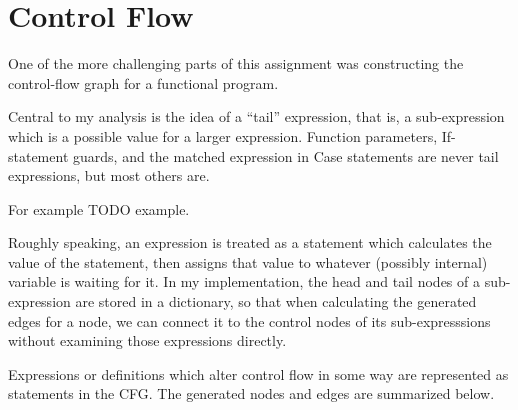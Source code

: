 \documentclass{article}
\begin{document}
\section{Control Flow}

One of the more challenging parts of this assignment was constructing the control-flow graph for a functional program.

Central to my analysis is the idea of a ``tail'' expression, that is, a sub-expression which is a possible value for a larger expression. Function parameters, If-statement guards, and the matched expression in Case statements are never tail expressions, but most others are.

For example TODO example.

Roughly speaking, an expression is treated as a statement which calculates the value of the statement, then assigns that value to whatever (possibly internal) variable is waiting for it. In my implementation, the head and tail nodes of a sub-expression are stored in a dictionary, so that when calculating the generated edges for a node, we can connect it to the control nodes of its sub-expresssions without examining those expressions directly.

Expressions or definitions which alter control flow in some way are represented as statements in the CFG. The generated nodes and edges are summarized below.
\end{document}
